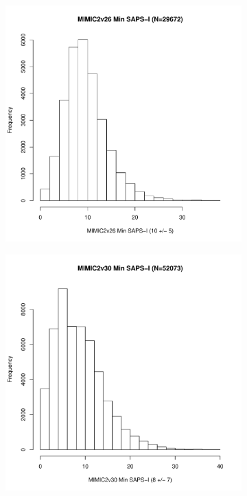 \documentclass[10pt]{article}
\begin{document}
\begin{figure}
        \begin{subfigure}[b]{0.5\textwidth}
                \includegraphics[width=\linewidth]{../../figure/fig_hist_sapsi_min_mimic2v26.pdf}
        \end{subfigure}%
        \begin{subfigure}[b]{0.5\textwidth}
                \includegraphics[width=\linewidth]{../../figure/fig_hist_sapsi_min_mimic2v30.pdf}
        \end{subfigure}
\end{figure}
\end{document}
